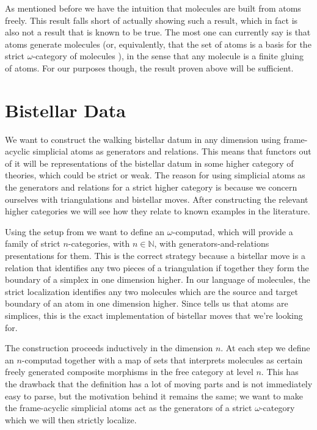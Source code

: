 \documentclass[12pt,a4paper]{article}
\numberwithin{equation}{section}
\begin{document}
\begin{remark}
    As mentioned before we have the intuition that molecules are built from atoms freely. This result falls short of actually showing such a result, which in fact is also not a result that is known to be true. The most one can currently say is that atoms generate molecules (or, equivalently, that the set of atoms is a basis for the strict $\omega$-category of molecules \cite[Prop.\,5.2.7]{hadzihasanovic}), in the sense that any molecule is a finite gluing of atoms. For our purposes though, the result proven above will be sufficient.
\end{remark}


\section{Bistellar Data}\label{sec:bistellar_definition}

We want to construct the walking bistellar datum in any dimension using frame-acyclic simplicial atoms as generators and relations. This means that functors out of it will be representations of the bistellar datum in some higher category of theories, which could be strict or weak. The reason for using simplicial atoms as the generators and relations for a strict higher category is because we concern ourselves with triangulations and bistellar moves. After constructing the relevant higher categories we will see how they relate to known examples in the literature.

Using the setup from  we want to define an $\omega$-computad, which will provide a family of strict $n$-categories, with $n \in \mathbb{N}$, with generators-and-relations presentations for them. This is the correct strategy because a bistellar move is a relation that identifies any two pieces of a triangulation if together they form the boundary of a simplex in one dimension higher. In our language of molecules, the strict localization identifies any two molecules which are the source and target boundary of an atom in one dimension higher. Since  tells us that atoms are simplices, this is the exact implementation of bistellar moves that we're looking for.

The construction proceeds inductively in the dimension $n$. At each step we define an $n$-computad together with a map of sets that interprets molecules as certain freely generated composite morphisms in the free category at level $n$. This has the drawback that the definition has a lot of moving parts and is not immediately easy to parse, but the motivation behind it remains the same; we want to make the frame-acyclic simplicial atoms act as the generators of a strict $\omega$-category which we will then strictly localize.
\end{document}
